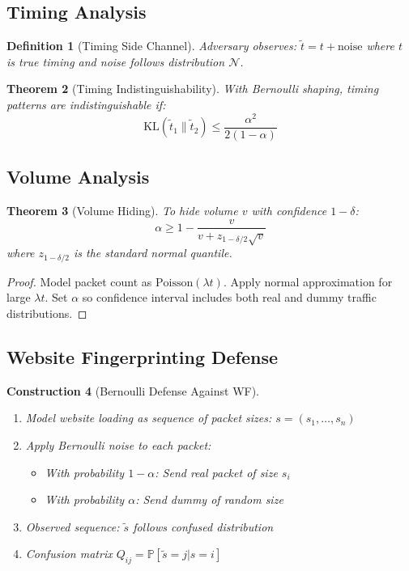 \documentclass[11pt,final]{article}
\newcommand{\latent}[1]{#1}
\newcommand{\observed}[1]{\tilde{#1}}
\newcommand{\Poisson}{\text{Poisson}}
\newtheorem{theorem}{Theorem}[section]
\newtheorem{definition}[theorem]{Definition}
\newtheorem{construction}[theorem]{Construction}
\begin{document}
\subsection{Timing Analysis}

\begin{definition}[Timing Side Channel]
Adversary observes: $\observed{t} = \latent{t} + \text{noise}$
where $\latent{t}$ is true timing and noise follows distribution $\mathcal{N}$.
\end{definition}

\begin{theorem}[Timing Indistinguishability]
With Bernoulli shaping, timing patterns are indistinguishable if:
\begin{equation}
\text{KL}(\observed{t}_1 \| \observed{t}_2) \leq \frac{\alpha^2}{2(1-\alpha)}
\end{equation}
\end{theorem}

\subsection{Volume Analysis}

\begin{theorem}[Volume Hiding]
To hide volume $v$ with confidence $1-\delta$:
\begin{equation}
\alpha \geq 1 - \frac{v}{v + z_{1-\delta/2}\sqrt{v}}
\end{equation}
where $z_{1-\delta/2}$ is the standard normal quantile.
\end{theorem}

\begin{proof}
Model packet count as $\Poisson(\lambda t)$. Apply normal approximation for large $\lambda t$. Set $\alpha$ so confidence interval includes both real and dummy traffic distributions.
\end{proof}

\subsection{Website Fingerprinting Defense}

\begin{construction}[Bernoulli Defense Against WF]
\begin{enumerate}
    \item Model website loading as sequence of packet sizes: $\latent{s} = (s_1, \ldots, s_n)$
    \item Apply Bernoulli noise to each packet:
        \begin{itemize}
            \item With probability $1-\alpha$: Send real packet of size $s_i$
            \item With probability $\alpha$: Send dummy of random size
        \end{itemize}
    \item Observed sequence: $\observed{s}$ follows confused distribution
    \item Confusion matrix $Q_{ij} = \mathbb{P}[\observed{s} = j | \latent{s} = i]$
\end{enumerate}
\end{construction}
\end{document}
